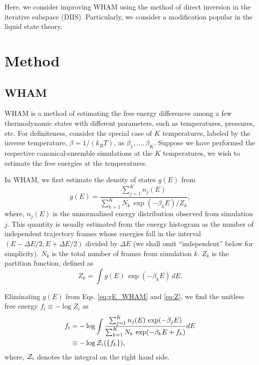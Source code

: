 \documentclass[aip,jcp,preprint,superscriptaddress]{revtex4-1}
\begin{document}
Here, we consider improving WHAM using
the method of direct inversion in the iterative subspace (DIIS)\cite{
pulay1980, *pulay1982, *hamilton1986}.
%
Particularly, we consider a modification
popular in the liquid state theory\cite{
kovalenko1999, howard2011}.





\section{Method}





\subsection{WHAM}



WHAM is a method of
estimating the free energy differences
among a few thermodynamic states
with different parameters,
such as temperatures, pressures, etc.
%
For definiteness,
consider the special case of $K$ temperatures,
labeled by the inverse temperature,
$\beta = 1/(k_B T)$,
as
$\beta_1, \ldots, \beta_K$.
%
Suppose we have performed the respective
canonical-ensemble simulations
at the $K$ temperatures,
we wish to estimate the free energies
at the temperatures.



In WHAM,
we first estimate the density of states $g(E)$ from
%
\begin{equation}
g(E)
=
\frac{
  \sum_{j = 1}^K n_j(E)
}
{
  \sum_{k = 1}^K N_k \, \exp(-\beta_k E) / Z_k
},
\label{eq:gE_WHAM}
\end{equation}
%
where,
$n_j(E)$
is the unnormalized energy distribution
observed from simulation $j$.
%
This quantity is usually estimated
from the energy histogram as
the number of independent trajectory frames
whose energies fall in the interval
$(E - \Delta E/2, E + \Delta E/2)$
divided by $\Delta E$
(we shall omit ``independent'' below for simplicity).
%
$N_k$
is the total number of frames
from simulation $k$.
%
$Z_k$
is the partition function,
defined as
%
\begin{equation}
Z_k
=
\int g(E) \, \exp(-\beta_k E) \, dE.
\label{eq:Z}
\end{equation}




Eliminating $g(E)$
from Eqs. \eqref{eq:gE_WHAM} and \eqref{eq:Z},
we find the unitless free energy
$f_i \equiv -\log Z_i$
as
\begin{align}
f_i
&=
-\log
  \int
    \frac{
      \sum_{j = 1}^K n_j(E) \, \exp(-\beta_j E)
    }
    {
      \sum_{k = 1}^K N_k \, \exp(-\beta_k E + f_k)
    }
    dE
\label{eq:f_WHAM}
\\
&\equiv
-\log \mathcal{Z}_i(\{ f_k \}),
\notag
\end{align}
%
where,
$\mathcal{Z}_i$
denotes the integral on the right hand side.
\end{document}
